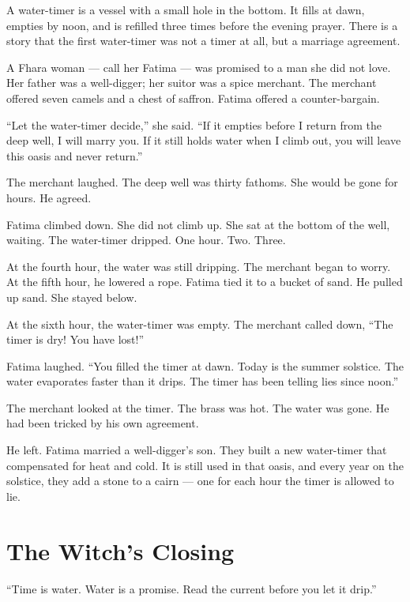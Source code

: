 \documentclass[10pt,twoside]{book}
\begin{document}
A water-timer is a vessel with a small hole in the bottom. It fills at dawn, empties by noon, and is refilled three times before the evening prayer. There is a story that the first water-timer was not a timer at all, but a marriage agreement.

A Fhara woman --- call her Fatima --- was promised to a man she did not love. Her father was a well-digger; her suitor was a spice merchant. The merchant offered seven camels and a chest of saffron. Fatima offered a counter-bargain.

``Let the water-timer decide,'' she said. ``If it empties before I return from the deep well, I will marry you. If it still holds water when I climb out, you will leave this oasis and never return.''

The merchant laughed. The deep well was thirty fathoms. She would be gone for hours. He agreed.

Fatima climbed down. She did not climb up. She sat at the bottom of the well, waiting. The water-timer dripped. One hour. Two. Three.

At the fourth hour, the water was still dripping. The merchant began to worry. At the fifth hour, he lowered a rope. Fatima tied it to a bucket of sand. He pulled up sand. She stayed below.

At the sixth hour, the water-timer was empty. The merchant called down, ``The timer is dry! You have lost!''

Fatima laughed. ``You filled the timer at dawn. Today is the summer solstice. The water evaporates faster than it drips. The timer has been telling lies since noon.''

The merchant looked at the timer. The brass was hot. The water was gone. He had been tricked by his own agreement.

He left. Fatima married a well-digger's son. They built a new water-timer that compensated for heat and cold. It is still used in that oasis, and every year on the solstice, they add a stone to a cairn --- one for each hour the timer is allowed to lie.

\section*{The Witch's Closing}
``Time is water. Water is a promise. Read the current before you let it drip.''
\end{document}
